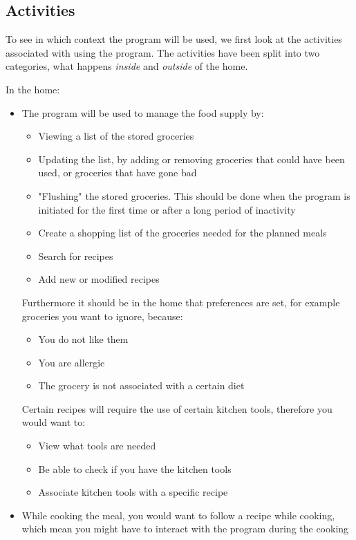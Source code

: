\subsection{Activities}
To see in which context the program will be used, we first look at the activities associated with using the program. The activities have been split into two categories, what happens \textit{inside} and \textit{outside} of the home.

In the home:
\begin{itemize}
\item The program will be used to manage the food supply by:
	\begin{itemize}
		\item Viewing a list of the stored groceries
		\item Updating the list, by adding or removing groceries that could have been used, or groceries that have gone bad
		\item "Flushing" the stored groceries. This should be done when the program is initiated for the first time or after a long period of inactivity
		\item Create a shopping list of the groceries needed for the planned meals
		\item Search for recipes
		\item Add new or modified recipes
	\end{itemize}
	Furthermore it should be in the home that preferences are set, for example groceries you want to ignore, because:
	\begin{itemize}
		\item You do not like them
		\item You are allergic
		\item The grocery is not associated with a certain diet
	\end{itemize}
	Certain recipes will require the use of certain kitchen tools, therefore you would want to:
	\begin{itemize}
		\item View what tools are needed
		\item Be able to check if you have the kitchen tools
		\item Associate kitchen tools with a specific recipe
	\end{itemize}
	\item While cooking the meal, you would want to follow a recipe while cooking, which mean you might have to interact with the program during the cooking
\end{itemize}

